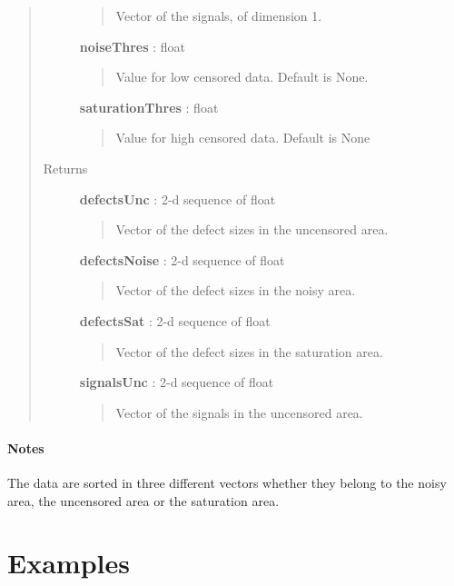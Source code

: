 \documentclass[letterpaper,10pt,english]{sphinxmanual}
\begin{document}
\begin{fulllineitems}
\begin{fulllineitems}
\begin{quote}
\begin{description}
\begin{quote}
Vector of the signals, of dimension 1.
\end{quote}

\textbf{noiseThres} : float
\begin{quote}

Value for low censored data. Default is None.
\end{quote}

\textbf{saturationThres} : float
\begin{quote}

Value for high censored data. Default is None
\end{quote}

\item[{Returns}] \leavevmode
\textbf{defectsUnc} : 2-d sequence of float
\begin{quote}

Vector of the defect sizes in the uncensored area.
\end{quote}

\textbf{defectsNoise} : 2-d sequence of float
\begin{quote}

Vector of the defect sizes in the noisy area.
\end{quote}

\textbf{defectsSat} : 2-d sequence of float
\begin{quote}

Vector of the defect sizes in the saturation area.
\end{quote}

\textbf{signalsUnc} : 2-d sequence of float
\begin{quote}

Vector of the signals in the uncensored area.
\end{quote}

\end{description}\end{quote}
\paragraph{Notes}

The data are sorted in three different vectors whether they belong to
the noisy area, the uncensored area or the saturation area.

\end{fulllineitems}


\end{fulllineitems}



\section{Examples}
\label{examples::doc}\label{examples:examples}
\end{document}
